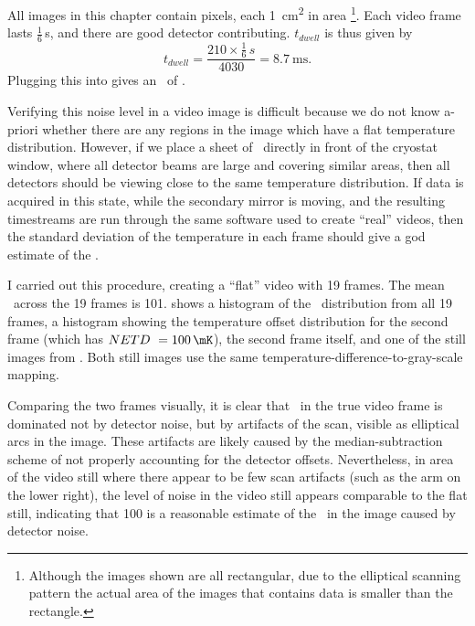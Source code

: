 All images in this chapter contain  pixels, each \SI{1}{\cm^2} in area%
\footnote{
  Although the images shown are all rectangular, due to the elliptical scanning pattern the actual area of the images that contains data is smaller than the rectangle.
}.
Each video frame lasts $\frac{1}{6}$\,\si{\s}, and there are  good detector contributing.
$t_{dwell}$ is thus given by
\begin{equation} \label{eqn:ch8-t-dwell}
  t_{dwell} = \frac{210 \times \frac{1}{6}\,\si{s}}{4030} = \SI{8.7}{\ms}.
\end{equation}
Plugging this into  gives an \NETD\ of .

Verifying this noise level in a video image is difficult because we do not know a-priori whether there are any regions in the image which have a flat temperature distribution.
However, if we place a sheet of \ecco\ directly in front of the cryostat window, where all detector beams are large and covering similar areas, then all detectors should be viewing close to the same temperature distribution.
If data is acquired in this state, while the secondary mirror is moving, and the resulting timestreams are run through the same software used to create ``real'' videos, then the standard deviation of the temperature in each frame should give a god estimate of the \NETD.

I carried out this procedure, creating a ``flat'' video with 19 frames.
The mean \NETD\ across the 19 frames is \SI{101}{\mK}.
 shows a histogram of the \NETD\ distribution from all 19 frames, a histogram showing the temperature offset distribution for the second frame (which has $\NETD\ = \SI{100}{\mK}$), the second frame itself, and one of the still images from .
Both still images use the same temperature-difference-to-gray-scale mapping.

Comparing the two frames visually, it is clear that \NETD\ in the true video frame is dominated not by detector noise, but by artifacts of the scan, visible as elliptical arcs in the image.
These artifacts are likely caused by the median-subtraction scheme of  not properly accounting for the detector offsets.
Nevertheless, in area of the video still where there appear to be few scan artifacts (such as the arm on the lower right), the level of noise in the video still appears comparable to the flat still, indicating that \SI{100}{\mK} is a reasonable estimate of the \NETD\ in the image caused by detector noise.

